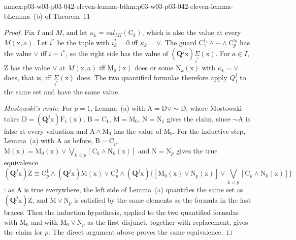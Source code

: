 \begin{annexitem}{annex:p03-w03-p03-042-eleven-lemma-b}{thm:p03-w03-p03-042-eleven-lemma-b}{Lemma~(b) of Theorem~11}
\begin{proof}
Fix \(I\) and \(M\), and let \(\kappa_k=\mathit{val}_{MI}(\mathrm C_k)\),
which is also the value at every \(M(\mathrm x,a)\).  Let \(i^*\) be the
tuple with \(i^*_k=0\) iff \(\kappa_k=\vee\).  The guard \(\mathrm
C_1^{i_1}\wedge\cdots\wedge\mathrm C_p^{i_p}\) has the value \(\vee\) iff
\(i=i^*\), so the right side has the value of \((\mathbf Q^j\mathrm x)
\underset{i^*}{\Sigma}(\mathrm x)\).  For \(a\in I\), \(\mathrm Z\) has
the value \(\vee\) at \(M(\mathrm x,a)\) iff \(\mathrm M_0(\mathrm x)\)
does or some \(\mathrm N_k(\mathrm x)\) with \(\kappa_k=\vee\) does, that
is, iff \(\underset{i^*}{\Sigma}(\mathrm x)\) does.  The two quantified
formulas therefore apply \(Q^j_I\) to the same set and have the same
value.

\emph{Mostowski's route.}  For \(p=1\), Lemma~(a) with \(\mathrm A=
\mathrm D\vee{\sim}\mathrm D\), where Mostowski takes \(\mathrm D=
(\mathbf Q^j\mathrm x)\mathrm F_1(\mathrm x)\), \(\mathrm B=
\mathrm C_1\), \(\mathrm M=\mathrm M_0\), \(\mathrm N=\mathrm N_1\) gives
the claim, since \({\sim}\mathrm A\) is false at every valuation and
\(\mathrm A\wedge\mathrm M_0\) has the value of \(\mathrm M_0\).  For the
inductive step, Lemma~(a) with \(\mathrm A\) as before, \(\mathrm B=
\mathrm C_p\), \(\mathrm M(\mathrm x)=\mathrm M_0(\mathrm x)\vee
\bigvee_{k<p}[\mathrm C_k\wedge\mathrm N_k(\mathrm x)]\) and \(\mathrm
N=\mathrm N_p\) gives the true equivalence
\[
 (\mathbf Q^j\mathrm x)\mathrm Z\equiv\mathrm C_p^1\wedge(\mathbf
 Q^j\mathrm x)\mathrm M(\mathrm x)\vee\mathrm C_p^0\wedge(\mathbf
 Q^j\mathrm x)\{[\mathrm M_0(\mathrm x)\vee\mathrm N_p(\mathrm x)]\vee
 \textstyle\bigvee_{k<p}[\mathrm C_k\wedge\mathrm N_k(\mathrm x)]\}
\]
\cite[p.~33]{Mostowski1957}: as \(\mathrm A\) is true everywhere, the
left side of Lemma~(a) quantifies the same set as \((\mathbf Q^j\mathrm
x)\mathrm Z\), and \(\mathrm M\vee\mathrm N_p\) is satisfied by the same
elements as the formula in the last braces.  Then the induction hypothesis, applied to the two quantified
formulas with \(\mathrm M_0\) and with \(\mathrm M_0\vee\mathrm N_p\) as
the first disjunct, together with replacement, gives the claim for \(p\).
The direct argument above proves the same equivalence.
\end{proof}
\end{annexitem}

